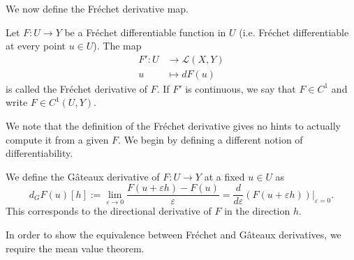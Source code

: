 We now define the Fréchet derivative map.
\begin{definition}
    Let $F:U\to Y$ be a Fréchet differentiable function in $U$ (i.e. Fréchet differentiable at every point $u\in U$). The map
    \begin{align*}
        F':U&\to \mathcal{L}(X,Y)\\
        u&\mapsto dF(u)
    \end{align*}
    is called the Fréchet derivative of $F$. If $F'$ is continuous, we say that $F\in C^1$ and write $F\in C^1(U,Y)$.
\end{definition}

We note that the definition of the Fréchet derivative gives no hints to actually compute it from a given $F$. We begin by defining a different notion of differentiability.
\begin{definition}
    We define the Gâteaux derivative of $F:U\to Y$ at a fixed $u\in U$ as
    \begin{equation*}
        d_G F(u)[h] := \lim_{\varepsilon\to 0} \frac{F(u+\varepsilon h)-F(u)}{\varepsilon} = \frac{d}{d\varepsilon}\left.\left(F(u+\varepsilon h)\right)\right|_{\varepsilon = 0}.
    \end{equation*}
    This corresponds to the directional derivative of $F$ in the direction $h$.
\end{definition}
In order to show the equivalence between Fréchet and Gâteaux derivatives, we require the mean value theorem. 


